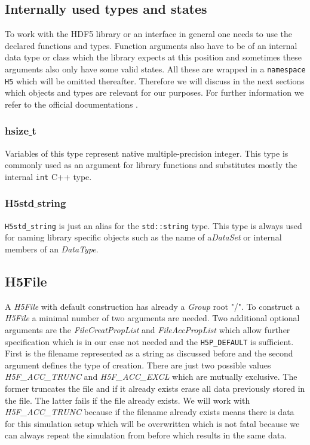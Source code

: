 \documentclass{article}
\begin{document}
\subsection{Internally used types and states}
To work with the HDF5 library or an interface in general one needs to use the declared functions and types. Function arguments also have to be of an internal data type or class which the library expects at this position and sometimes these arguments also only have some valid states. All these are wrapped in a \texttt{namespace H5} which will be omitted thereafter. Therefore we will discuss in the next sections which objects and types are relevant for our purposes. For further information we refer to the official documentations \cite{hdf5cppdoc} \cite{hdf5cdoc}.
\subsubsection{hsize$\_$t}
Variables of this type represent native multiple-precision integer. This type is commonly used as an argument for library functions and substitutes mostly the internal \texttt{int} C++ type.
\subsubsection{H5std$\_$string}
\texttt{H5std\_string} is just an alias for the \texttt{std::string} type. This type is always used for naming library specific objects such as the name of a\textit{DataSet} or internal members of an \textit{DataType}.
\subsection{H5File}
A \textit{H5File} with default construction has already a \textit{Group} root "/". To construct a \textit{H5File}  a minimal number of two arguments are needed. Two additional optional arguments are the \textit{FileCreatPropList} and \textit{FileAccPropList} which allow further specification which is in our case not needed and the \texttt{H5P\_DEFAULT} is sufficient. First is the filename represented as a string as discussed before and the second argument defines the type of creation. There are just two possible values \textit{H5F\_ACC\_TRUNC} and \textit{H5F\_ACC\_EXCL} which are mutually exclusive. The former truncates the file and if it already exists erase all data previously stored in the file. The latter fails if the file already exists. We will work with \textit{H5F\_ACC\_TRUNC} because if the filename already exists means there is data for this simulation setup which will be overwritten which is not fatal because we can always repeat the simulation from before which results in the same data.
\end{document}
